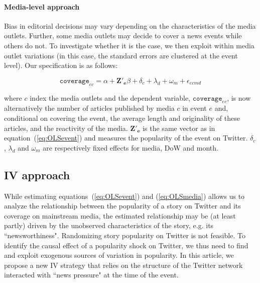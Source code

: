 \paragraph{Media-level approach}

Bias in editorial decisions may vary depending on the characteristics of the media outlets. Further, some media outlets may decide to cover a news events while others do not. To investigate whether it is the case, we then exploit within media outlet variations (in this case, the standard errors are clustered at the event level). Our specification is as follows: 

\begin{equation}
\mathtt{coverage}_{ec}= \alpha + \mathbf{Z'_{e}}\beta +  \delta_{c}  + \lambda_d + \omega_m +\epsilon_{ecmd}
\label{eq:OLSmedia}
\end{equation}

\noindent where $c$ index the media outlets and the dependent variable, $\mathtt{coverage}_{ec}$, is now alternatively the number of articles published by media $c$ in event $e$ and, conditional on covering the event, the average length and originality of these articles, and the reactivity of the media. $\mathbf{Z'_{e}}$ is the same vector as in equation~(\ref{eq:OLSevent}) and measures the popularity of the event on Twitter. $\delta_{c}$,  $\lambda_d$ and $\omega_m$ are respectively fixed effects for media, DoW and month.



\subsection{IV approach\label{Sec:SpecificationIV}}

While estimating equations~(\ref{eq:OLSevent}) and (\ref{eq:OLSmedia}) allows us to analyze the relationship between the popularity of a story on Twitter and its coverage on mainstream media, the estimated relationship may be (at least partly) driven by the unobserved characteristics of the story, e.g. its ``newsworthiness". Randomizing story popularity on Twitter is not feasible. To identify the causal effect of a popularity shock on Twitter, we thus need to find and exploit exogenous sources of variation in popularity. In this article, we propose a new IV strategy that relies on the structure of the Twitter network interacted with ``news pressure" at the time of the event.

